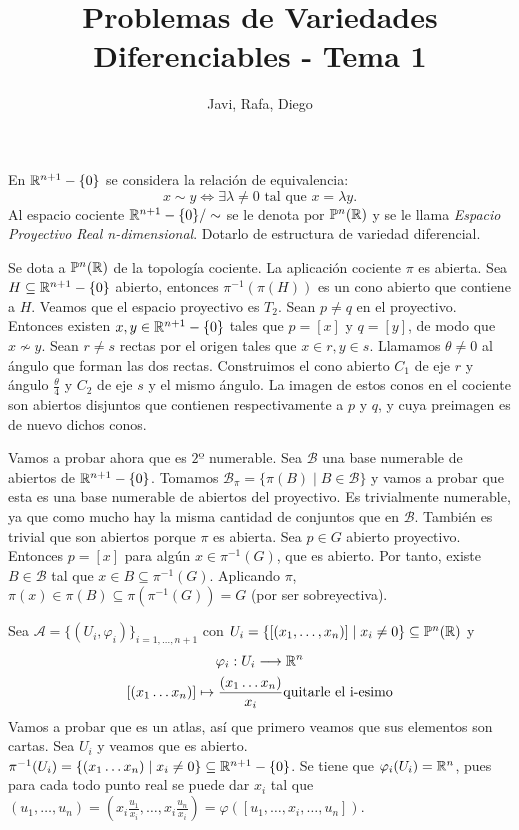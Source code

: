 \documentclass[twoside]{article}
\begin{document}
\title{Problemas de Variedades Diferenciables - Tema 1}
\author{Javi, Rafa, Diego}
\maketitle



\begin{ejercicio}{1}\label{1}
En $\mathbb{R}^{n+1}-\{0\}$ se considera la relación de equivalencia:
$$x\sim y\Leftrightarrow\exists\lambda\neq 0\text{ tal que } x=\lambda y.$$
Al espacio cociente $\mathbb{R}^{n+1}-\{0\}/\sim$ se le denota por $\mathbb{P}^n(\mathbb{R})$ y se le llama
\emph{Espacio Proyectivo Real n-dimensional}. Dotarlo de estructura de variedad diferencial.
\end{ejercicio}
\begin{solucion}
Se dota a $\mathbb{P}^n(\mathbb{R})$ de la topología cociente. La aplicación cociente $\pi$ es abierta. Sea $H\subseteq\mathbb{R}^{n+1}-\{0\}$ abierto, entonces $\pi^{-1}(\pi(H))$ es un cono abierto que contiene a $H$. Veamos que el espacio proyectivo es $T_2$. Sean $p\neq q$ en el proyectivo. Entonces existen $x,y\in\mathbb{R}^{n+1}-\{0\}$ tales que $p=[x]$ y $q=[y]$, de modo que $x\not\sim y$. Sean $r\neq s$ rectas por el origen tales que $x\in r, y\in s$. Llamamos $\theta\neq 0$ al ángulo que forman las dos rectas. Construimos el cono abierto $C_1$ de eje $r$ y ángulo $\frac{\theta}{4}$ y $C_2$ de eje $s$ y el mismo ángulo. La imagen de estos conos en el cociente son abiertos disjuntos que contienen respectivamente a $p$ y $q$, y cuya preimagen es de nuevo dichos conos. 

Vamos a probar ahora que es $2º$ numerable. Sea $\mathcal{B}$ una base numerable de abiertos de $\mathbb{R}^{n+1}-\{0\}$. Tomamos $\mathcal{B}_\pi=\{\pi(B)\mid B\in\mathcal{B}\}$ y vamos a probar que esta es una base numerable de abiertos del proyectivo. Es trivialmente numerable, ya que como mucho hay la misma cantidad de conjuntos que en $\mathcal{B}$. También es trivial que son abiertos porque $\pi$ es abierta. Sea $p\in G$ abierto proyectivo.  Entonces $p=[x]$ para algún $x\in\pi^{-1}(G)$, que es abierto. Por tanto, existe $B\in\mathcal{B}$ tal que $x\in B\subseteq\pi^{-1}(G)$. Aplicando $\pi$, $\pi(x)\in\pi(B)\subseteq\pi(\pi^{-1}(G))=G$ (por ser sobreyectiva). 

Sea $\mathcal{A}=\{(U_i,\varphi_i)\}_{i=1,\dots,n+1}$ con $U_i=\{[(x_1,\dots,x_n)]\mid x_i\neq 0\}\subseteq\mathbb{P}^n(\mathbb{R})$ y 
\begin{gather*}
\varphi_i : U_i\longrightarrow\R^n\\
[(\xn{n})]\mapsto\frac{(\xn{n})}{x_i}\text{quitarle el i-esimo}
\end{gather*}
Vamos a probar que es un atlas, así que primero veamos que sus elementos son cartas. Sea $U_i$ y veamos que es abierto. $\pi^{-1}(U_i)=\{(x_1\dotsc x_{n})\mid x_i\neq 0\}\subseteq\mathbb{R}^{n+1}-\{0\}$. Se tiene que $\varphi_i(U_i)=\mathbb{R}^n$, pues para cada todo punto real se puede dar $x_i$ tal que $(u_1,\dots,u_n)=(x_i\frac{u_1}{x_i},\dots, x_i\frac{u_n}{x_i})=\varphi([u_1,\dots, x_i,\dots,u_n])$.


\end{solucion}
\end{document}
